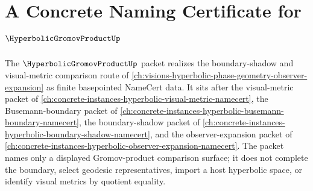 \chapter{A Concrete Naming Certificate for $\HyperbolicGromovProductUp$}
\label{ch:concrete-instances-hyperbolic-gromov-product-namecert}

The $\HyperbolicGromovProductUp$ packet realizes the boundary-shadow and visual-metric comparison route of \autoref{ch:visions-hyperbolic-phase-geometry-observer-expansion} as finite basepointed NameCert data. It sits after the visual-metric packet of \autoref{ch:concrete-instances-hyperbolic-visual-metric-namecert}, the Busemann-boundary packet of \autoref{ch:concrete-instances-hyperbolic-busemann-boundary-namecert}, the boundary-shadow packet of \autoref{ch:concrete-instances-hyperbolic-boundary-shadow-namecert}, and the observer-expansion packet of \autoref{ch:concrete-instances-hyperbolic-observer-expansion-namecert}. The packet names only a displayed Gromov-product comparison surface; it does not complete the boundary, select geodesic representatives, import a host hyperbolic space, or identify visual metrics by quotient equality.

